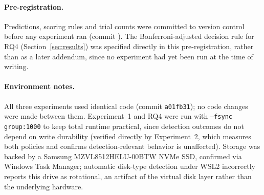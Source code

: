 \paragraph{Pre-registration.} Predictions, scoring rules and trial counts were committed to version control before any experiment ran (commit \texttt{\akmPreregCommit{}}). The Bonferroni-adjusted decision rule for RQ4 (Section~\ref{sec:results}) was specified directly in this pre-registration, rather than as a later addendum, since no experiment had yet been run at the time of writing.

\paragraph{Environment notes.} All three experiments used identical code (commit \texttt{a01fb31}); no code changes were made between them. Experiment~1 and RQ4 were run with \texttt{--fsync group:1000} to keep total runtime practical, since detection outcomes do not depend on write durability (verified directly by Experiment~2, which measures both policies and confirms detection-relevant behavior is unaffected). Storage was backed by a Samsung MZVL8512HELU-00BTW NVMe SSD, confirmed via Windows Task Manager; automatic disk-type detection under WSL2 incorrectly reports this drive as rotational, an artifact of the virtual disk layer rather than the underlying hardware.
